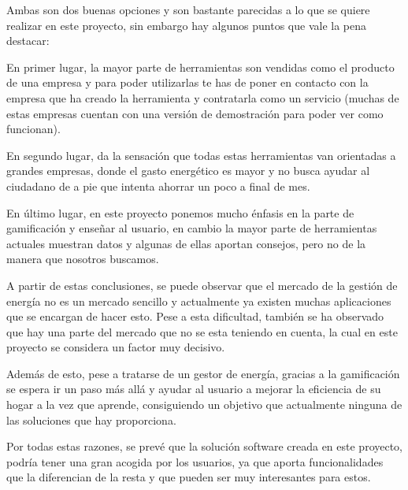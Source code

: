 Ambas son dos buenas opciones y son bastante parecidas a lo que se quiere realizar en este proyecto, sin embargo hay algunos puntos que vale la pena destacar:

En primer lugar, la mayor parte de herramientas son vendidas como el producto de una empresa y para poder utilizarlas te has de poner en contacto con la empresa que ha creado la herramienta y contratarla como un servicio (muchas de estas empresas cuentan con una versión de demostración para poder ver como funcionan).

En segundo lugar, da la sensación que todas estas herramientas van orientadas a grandes empresas, donde el gasto energético es mayor y no busca ayudar al ciudadano de a pie que intenta ahorrar un poco a final de mes.

En último lugar, en este proyecto ponemos mucho énfasis en la parte de gamificación y enseñar al usuario, en cambio la mayor parte de herramientas actuales muestran datos y algunas de ellas aportan consejos, pero no de la manera que nosotros buscamos.

A partir de estas conclusiones, se puede observar que el mercado de la gestión de energía no es un mercado sencillo y actualmente ya existen muchas aplicaciones que se encargan de hacer esto. Pese a esta dificultad, también se ha observado que hay una parte del mercado que no se esta teniendo en cuenta, la cual en este proyecto se considera un factor muy decisivo.

Además de esto, pese a tratarse de un gestor de energía, gracias a la gamificación se espera ir un paso más allá y ayudar al usuario a mejorar la eficiencia de su hogar a la vez que aprende, consiguiendo un objetivo que actualmente ninguna de las soluciones que hay proporciona.

Por todas estas razones, se prevé que la solución software creada en este proyecto, podría tener una gran acogida por los usuarios, ya que aporta funcionalidades que la diferencian de la resta y que pueden ser muy interesantes para estos.


